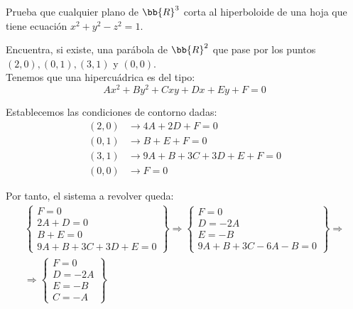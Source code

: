 \begin{ejercicio}
    Prueba que cualquier plano de $\bb{R}^3$ corta al hiperboloide de una hoja que tiene ecuación $x^2+y^2-z^2 = 1$.
\end{ejercicio}



\begin{ejercicio}
    Encuentra, si existe, una parábola de $\bb{R}^2$ que pase por los puntos $(2, 0), (0, 1), (3, 1)$ y $(0, 0)$.\\

    Tenemos que una hipercuádrica es del tipo:
    \begin{equation*}
        Ax^2+By^2+Cxy+Dx+Ey+F=0
    \end{equation*}

    Establecemos las condiciones de contorno dadas:
    \begin{equation*}
        \begin{split}
            (2,0)&\longrightarrow 4A+2D+F=0\\
            (0,1)&\longrightarrow B+E+F=0\\
            (3,1)&\longrightarrow 9A+B+3C+3D+E+F=0\\
            (0,0)&\longrightarrow F=0
        \end{split}
    \end{equation*}

    Por tanto, el sistema a revolver queda:
    \begin{multline*}
        \left\{\begin{array}{l}
            F=0\\
            2A+D=0 \\
            B+E=0\\
            9A+B+3C+3D+E=0
        \end{array}\right\}
        \Longrightarrow
        \left\{\begin{array}{l}
            F=0\\
            D=-2A \\
            E=-B\\
            9A+B+3C-6A-B=0
        \end{array}\right\}
        \Longrightarrow \\ \Longrightarrow
        \left\{\begin{array}{l}
            F=0\\
            D=-2A \\
            E=-B\\
            C=-A
        \end{array}\right\}
    \end{multline*}


\end{ejercicio}
